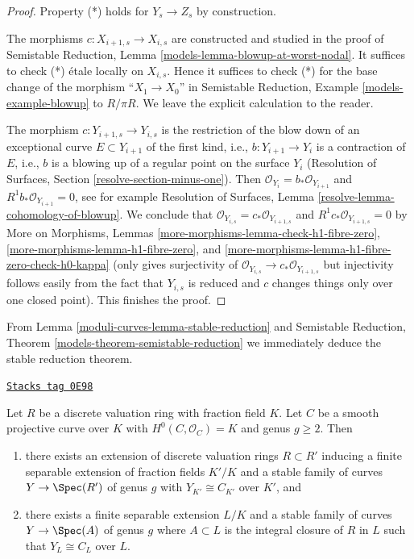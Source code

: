 \begin{proof}
\medskip\noindent
Property (*) holds for $Y_s \to Z_s$ by construction.

\medskip\noindent
The morphisms $c : X_{i + 1, s} \to X_{i, s}$ are constructed and studied
in the proof of
Semistable Reduction, Lemma \ref{models-lemma-blowup-at-worst-nodal}.
It suffices to check (*) \'etale locally on $X_{i, s}$.
Hence it suffices to check (*) for the base change of the morphism
``$X_1 \to X_0$'' in Semistable Reduction, Example \ref{models-example-blowup}
to $R/\pi R$.
We leave the explicit calculation to the reader.

\medskip\noindent
The morphism $c : Y_{i + 1, s} \to Y_{i, s}$ is the restriction
of the blow down of an exceptional curve $E \subset Y_{i + 1}$
of the first kind, i.e., $b : Y_{i + 1} \to Y_i$ is a contraction of $E$,
i.e., $b$ is a blowing up of a regular point on the surface $Y_i$
(Resolution of Surfaces, Section \ref{resolve-section-minus-one}).
Then $\mathcal{O}_{Y_i} = b_*\mathcal{O}_{Y_{i + 1}}$ and
$R^1b_*\mathcal{O}_{Y_{i + 1}} = 0$, see for example
Resolution of Surfaces, Lemma
\ref{resolve-lemma-cohomology-of-blowup}.
We conclude that $\mathcal{O}_{Y_{i, s}} = c_*\mathcal{O}_{Y_{i + 1, s}}$
and $R^1c_*\mathcal{O}_{Y_{i + 1, s}} = 0$ by
More on Morphisms, Lemmas \ref{more-morphisms-lemma-check-h1-fibre-zero},
\ref{more-morphisms-lemma-h1-fibre-zero}, and
\ref{more-morphisms-lemma-h1-fibre-zero-check-h0-kappa}
(only gives surjectivity of
$\mathcal{O}_{Y_{i, s}} \to c_*\mathcal{O}_{Y_{i + 1, s}}$ but
injectivity follows easily from the fact that $Y_{i, s}$ is reduced
and $c$ changes things only over one closed point).
This finishes the proof.
\end{proof}

From Lemma \ref{moduli-curves-lemma-stable-reduction} and
Semistable Reduction, Theorem \ref{models-theorem-semistable-reduction}
we immediately deduce the stable reduction theorem.

\begin{theorem}
\label{moduli-curves-theorem-stable-reduction}
\href{https://stacks.math.columbia.edu/tag/0E98}{\texttt{Stacks tag 0E98}}

\begin{reference}
\cite[Corollary 2.7]{DM}
\end{reference}
Let $R$ be a discrete valuation ring with fraction field $K$. Let $C$ be a
smooth projective curve over $K$ with $H^0(C, \mathcal{O}_C) = K$
and genus $g \geq 2$. Then
\begin{enumerate}
\item there exists an extension of discrete valuation rings $R \subset R'$
inducing a finite separable extension of fraction fields $K'/K$ and
a stable family of curves $Y \to \Spec(R')$ of genus $g$ with
$Y_{K'} \cong C_{K'}$ over $K'$, and
\item there exists a finite separable extension $L/K$ and a stable
family of curves $Y \to \Spec(A)$ of genus $g$ where $A \subset L$
is the integral closure of $R$ in $L$ such that
$Y_L \cong C_L$ over $L$.
\end{enumerate}
\end{theorem}

